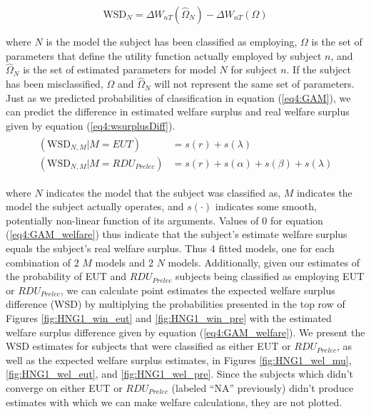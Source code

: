 \documentclass[../main.tex]{subfiles}
\begin{document}
\begin{equation}
	\label{eq4:wsurplusDiff}
	\text{WSD}_N = \Delta W_{nT}(\hat{\Omega}_N) - \Delta W_{nT}(\Omega)
\end{equation}

\noindent where $N$ is the model the subject has been classified as employing, $\Omega$ is the set of parameters that define the utility function actually employed by subject $n$, and $\hat{\Omega}_N$ is the set of estimated parameters for model $N$ for subject $n$.
If the subject has been misclassified, $\Omega$ and $\hat{\Omega}_N$ will not represent the same set of parameters.
Just as we predicted probabilities of classification in equation (\ref{eq4:GAM}), we can predict the difference in estimated welfare surplus and real welfare surplus given by equation (\ref{eq4:wsurplusDiff}).
\begin{align}
	\label{eq4:GAM_welfare}
	\begin{split}
		(\text{WSD}_{N,M} | M = EUT)                   &= s(r) + s(\lambda)\\
		(\text{WSD}_{N,M} | M = \mathit{RDU_{Prelec}}) &= s(r) + s(\alpha) + s(\beta) + s(\lambda)
	\end{split}
\end{align}

\noindent where $N$ indicates the model that the subject was classified as, $M$ indicates the model the subject actually operates, and $s(\cdot)$ indicates some smooth, potentially non-linear function of its arguments.
Values of 0 for equation (\ref{eq4:GAM_welfare}) thus indicate that the subject's estimate welfare surplus equals the subject's real welfare surplus.
Thus 4 fitted models, one for each combination of 2 $M$ models and 2 $N$ models.
Additionally, given our estimates of the probability of EUT and $\mathit{RDU_{Prelec}}$ subjects being classified as employing EUT or $\mathit{RDU_{Prelec}}$, we can calculate point estimates the expected welfare surplus difference (WSD) by multiplying the probabilities presented in the top row of Figures \ref{fig:HNG1_win_eut} and \ref{fig:HNG1_win_pre} with the estimated welfare surplus difference given by equation (\ref{eq4:GAM_welfare}).
We present the WSD estimates for subjects that were classified as either EUT or $\mathit{RDU_{Prelec}}$, as well as the expected welfare surplus estimates, in Figures \ref{fig:HNG1_wel_mu}, \ref{fig:HNG1_wel_eut}, and \ref{fig:HNG1_wel_pre}.
Since the subjects which didn't converge on either EUT or $\mathit{RDU_{Prelec}}$ (labeled \enquote{NA} previously) didn't produce estimates with which we can make welfare calculations, they are not plotted.
\end{document}
